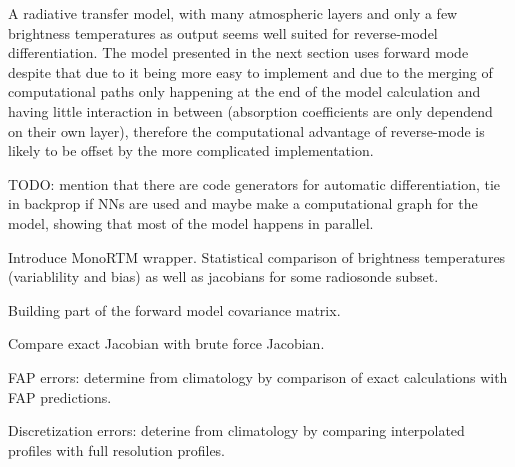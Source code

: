         A radiative transfer model, with many atmospheric layers and only
        a few brightness temperatures as output seems well suited for
        reverse-model differentiation. The model presented in the next section
        uses forward mode despite that due to it being more easy to implement
        and due to the merging of computational paths only happening at the end
        of the model calculation and having little interaction in between
        (absorption coefficients are only dependend on their own layer),
        therefore the computational advantage of reverse-mode is likely to be
        offset by the more complicated implementation.

        TODO: mention that there are code generators for automatic
        differentiation, tie in backprop if NNs are used and maybe make a
        computational graph for the model, showing that most of the model
        happens in parallel.

    \stopsubsection


    \startsubsection[title=Evaluation of Model Performance]

        Introduce MonoRTM wrapper. Statistical comparison of brightness
        temperatures (variablility and bias) as well as jacobians for some
        radiosonde subset.

    \stopsubsection


    \startsubsection[title={Characterizing Errors},reference={ch:rtm_errors}]

        Building part of the forward model covariance matrix.

        Compare exact Jacobian with brute force Jacobian.

        FAP errors: determine from climatology by comparison of exact
        calculations with FAP predictions.

        Discretization errors: deterine from climatology by comparing
        interpolated profiles with full resolution profiles.

    \stopsubsection

\stopsection

